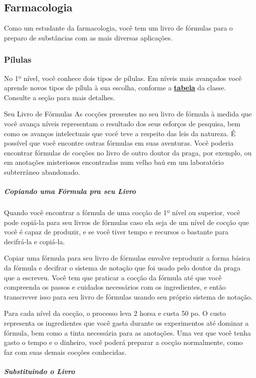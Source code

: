 \documentclass[letterpaper,twocolumn,openany]{dndbook}
\begin{document}
	\subsection{Farmacologia}
	Como um estudante da farmacologia, você tem um livro de fórmulas para o preparo de substâncias com as mais diversas aplicações.
	
	\subsubsection{Pílulas}
	No 1º nível, você conhece dois tipos de pílulas. Em níveis mais avançados você aprende novos tipos de pílula à sua escolha, conforme a \hyperref[tab:doutor_da_praga]{\textbf{tabela}} da classe. Consulte a seção \textbf{} para mais detalhes.
	
	\begin{paperbox}[float=!b]{Seu Livro de Fórmulas}
		\label{box:seu_livro_de_formulas}
		As cocções presentes no seu livro de fórmula à medida que você avança níveis representam o resultado dos seus esforços de pesquisa, bem como os avanços intelectuais que você teve a respeito das leis da natureza. É possível que você encontre outras fórmulas em suas aventuras. Você poderia encontrar fórmulas de cocções no livro de outro doutor da praga, por exemplo, ou em anotações misteriosos encontradas num velho baú em um laboratório subterrâneo abandonado.
		\subparagraph{Copiando uma Fórmula pra seu Livro} Quando você encontrar a fórmula de uma cocção de 1º nível ou superior, você pode copiá-la para seu livros de fórmulas caso ela seja de um nível de cocção que você é capaz de produzir, e se você tiver tempo e recursos o bastante para decifrá-la e copiá-la.
		\par Copiar uma fórmula para seu livro de fórmulas envolve reproduzir a forma básica da fórmula e decifrar o sistema de notação que foi usado pelo doutor da praga que a escreveu. Você tem que praticar a cocção da fórmula até que você compreenda os passos e cuidados necessários com os ingredientes, e então transcrever isso para seu livro de fórmulas usando seu próprio sistema de notação.
		\par Para cada nível da cocção, o processo leva 2 horsa e custa 50 po. O custo representa os ingredientes que você gasta durante os experimentos até dominar a fórmula, bem como a tinta necessária para as anotações. Uma vez que você tenha gasto o tempo e o dinheiro, você poderá preparar a cocção normalmente, como faz com suas demais cocções conhecidas.
		\subparagraph{Substituindo o Livro}

\end{paperbox}
\end{document}
